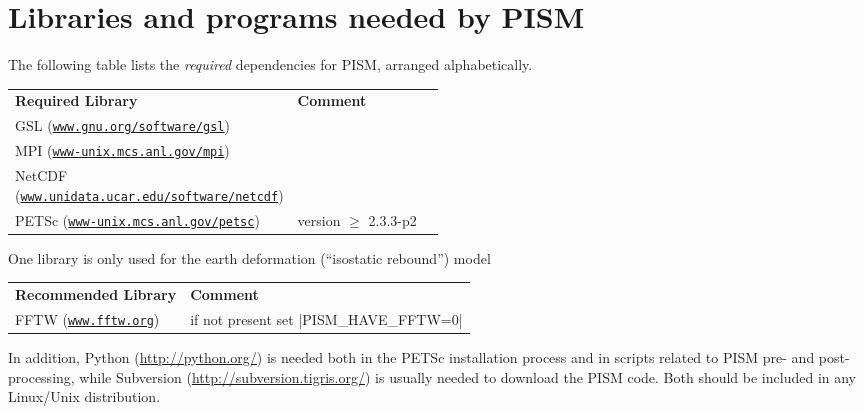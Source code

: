\documentclass[11pt,final]{amsart}
\newcommand{\PETSCREL}{2.3.3-p2}
\newcommand{\normalspacing}{\renewcommand{\baselinestretch}{1.1}\tiny\normalsize}
\renewcommand{\t}[1]{\texttt{#1}}
\begin{document}
\clearpage
\section{Libraries and programs needed by PISM}
\label{sec:prerequisites}

\bigskip
The following table lists the \emph{required} dependencies for PISM, arranged alphabetically.
\bigskip
\newcommand{\fattablespacing}{\renewcommand{\baselinestretch}{1.5}\tiny\normalsize}
\fattablespacing
\newcommand\pairstack[2]{#1 \quad (\small#2\normalsize)}
\begin{center}
\begin{tabular*}{1.0\linewidth}{lp{0.5\linewidth}}\hline
  \textbf{Required Library} & \textbf{Comment} \\
  \pairstack{GSL}{\href{http://www.gnu.org/software/gsl/}{\t{www.gnu.org/software/gsl}}}  &  \\
  \pairstack{MPI}{\href{http://www-unix.mcs.anl.gov/mpi/}{\t{www-unix.mcs.anl.gov/mpi}}}  & \\
  \pairstack{NetCDF}{\href{http://www.unidata.ucar.edu/software/netcdf/}{\t{www.unidata.ucar.edu/software/netcdf}}}  & \\
  \pairstack{PETSc}{\href{http://www-unix.mcs.anl.gov/petsc/petsc-as/}{\t{www-unix.mcs.anl.gov/petsc}}}  & version $\ge$ \PETSCREL \\
  \hline
\end{tabular*}
\end{center}
\normalspacing\bigskip

\noindent One library is only used for the earth deformation (``isostatic rebound'') model
\bigskip
\fattablespacing
\begin{center}
\begin{tabular*}{1.0\linewidth}{ll}\hline
  \textbf{Recommended Library} & \textbf{Comment} \\
  \pairstack{FFTW}{\href{http://www.fftw.org/}{\t{www.fftw.org}}}\hspace{1.9in} & if not present set |PISM_HAVE_FFTW=0|\\
  \hline
\end{tabular*}
\end{center}
\normalspacing
\bigskip

\noindent In addition, Python (\url{http://python.org/}) is needed both in the PETSc installation process and in scripts related to PISM pre- and post-processing, while Subversion (\url{http://subversion.tigris.org/}) is usually needed to download the PISM code.  Both should be included in any Linux/Unix distribution.
\end{document}
